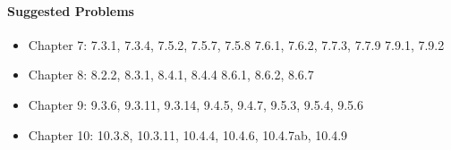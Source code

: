 \paragraph*{Suggested Problems}
\begin{itemize}
  \item Chapter 7: 7.3.1, 7.3.4, 7.5.2, 7.5.7, 7.5.8 7.6.1, 7.6.2, 7.7.3, 7.7.9 7.9.1, 7.9.2
  \item Chapter 8: 8.2.2, 8.3.1, 8.4.1, 8.4.4 8.6.1, 8.6.2, 8.6.7
  \item Chapter 9: 9.3.6, 9.3.11, 9.3.14, 9.4.5, 9.4.7, 9.5.3, 9.5.4, 9.5.6
  \item Chapter 10: 10.3.8, 10.3.11, 10.4.4, 10.4.6, 10.4.7ab, 10.4.9
\end{itemize}







